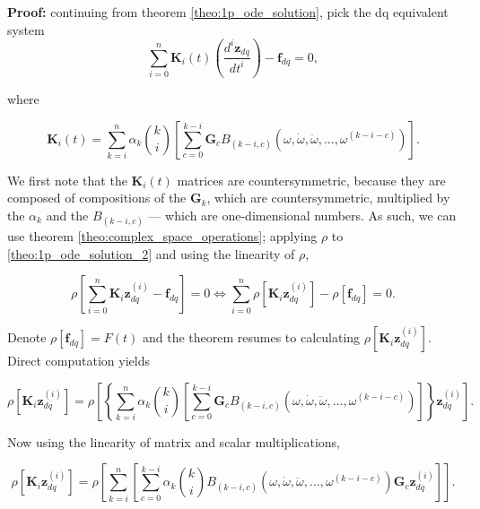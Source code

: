 \textbf{Proof:} continuing from theorem \ref{theo:1p_ode_solution}, pick the dq equivalent system
\begin{equation} \sum\limits_{i=0}^n \mathbf{K}_i(t) \left(\dfrac{d^i \mathbf{z}_{dq}}{dt^i }\right) - \mathbf{f}_{dq} = 0 , \label{theo:1p_ode_solution_2}\end{equation}

	\noindent where

\begin{equation} \mathbf{K}_i(t) = \sum\limits_{k=i}^{n} \alpha_k{k\choose i} \left[\sum\limits_{c=0}^{k-i} \mathbf{G}_c B_{\left(k-i,c\right)}\left(\omega,\dot{\omega},\ddot{\omega},...,\omega^{(k-i-c)}\right) \right] .\end{equation}

	We first note that the $\mathbf{K}_i(t)$ matrices are countersymmetric, because they are composed of compositions of the $\mathbf{G}_k$, which are countersymmetric, multiplied by the $\alpha_k$ and the $B_{\left(k-i,c\right)}$ — which are one-dimensional numbers. As such, we can use theorem \ref{theo:complex_space_operations}; applying $\rho$ to \eqref{theo:1p_ode_solution_2} and using the linearity of $\rho$,

\begin{equation} \rho\left[\sum\limits_{i=0}^n \mathbf{K}_i\mathbf{z}^{(i)}_{dq} - \mathbf{f}_{dq}\right] = 0 \Leftrightarrow \sum\limits_{i=0}^n \rho\left[\mathbf{K}_i\mathbf{z}^{(i)}_{dq}\right] - \rho\left[\mathbf{f}_{dq}\right] = 0 . \label{eq:complex_equiv_odes_4}\end{equation}

	Denote  $\rho\left[\mathbf{f}_{dq}\right] = F(t)$ and the theorem resumes to calculating $\rho\left[\mathbf{K}_i\mathbf{z}^{(i)}_{dq}\right]$. Direct computation yields

\begin{equation} \rho\left[\mathbf{K}_i\mathbf{z}^{(i)}_{dq}\right] = \rho\left[\left\{\sum\limits_{k=i}^{n} \alpha_k{k\choose i} \left[\sum\limits_{c=0}^{k-i} \mathbf{G}_c B_{\left(k-i,c\right)}\left(\omega,\dot{\omega},\ddot{\omega},...,\omega^{(k-i-c)}\right) \right]\right\}\mathbf{z}^{(i)}_{dq}\right] .\end{equation}

	Now using the linearity of matrix and scalar multiplications,

\begin{equation} \rho\left[\mathbf{K}_i\mathbf{z}^{(i)}_{dq}\right] = \rho\left[\sum\limits_{k=i}^{n} \left[ \sum\limits_{c=0}^{k-i} \alpha_k{k\choose i} B_{\left(k-i,c\right)}\left(\omega,\dot{\omega},\ddot{\omega},...,\omega^{(k-i-c)}\right) \mathbf{G}_c\mathbf{z}^{(i)}_{dq}\right] \right].\end{equation}

